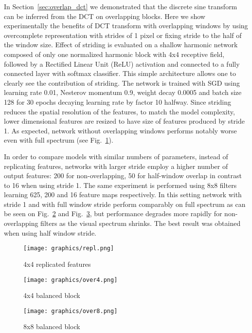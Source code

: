 \documentclass[conference]{IEEEtran}
\begin{document}
In Section~\ref{sec:overlap_dct} we  demonstrated that the discrete sine transform can be inferred from the DCT on overlapping blocks. Here we show experimentally the benefits of DCT transform with overlapping windows by using overcomplete representation with strides of 1 pixel or fixing stride to the half of the window size.
Effect of striding is evaluated on a shallow harmonic network composed of only one normalized harmonic block with 4x4 receptive field, followed by a Rectified Linear Unit (ReLU) activation and connected to a fully connected layer with softmax classifier. This simple architecture allows one to clearly see the contribution of striding. The network is trained with SGD using learning rate 0.01, Nesterov momentum 0.9, weight decay 0.0005 and batch size 128 for 30 epochs decaying learning rate by factor 10 halfway.
Since striding reduces the spatial resolution of the features, to match the model complexity, lower dimensional features are resized to have size of features produced by stride 1. As expected, network without overlapping windows performs notably worse even with full spectrum (see Fig.~\ref{fig:stride_repl}). 

In order to compare models with similar numbers of parameters, instead of replicating features, networks with larger stride employ a higher number of output features: 200 for non-overlapping, 50 for half-window overlap in contrast to 16 when using stride 1. The same experiment is performed using 8x8 filters learning 625, 200 and 16 feature maps respectively. In this setting network with stride 1 and with full window stride perform comparably on full spectrum as can be seen on Fig.~\ref{fig:stride_bal4} and Fig.~\ref{fig:stride_bal8}, but performance degrades more rapidly for non-overlapping filters as the visual spectrum shrinks. The best result was obtained when using half window stride.

\begin{figure*}
 \centering
 \begin{subfigure}[b]{0.323\linewidth}
  \texttt{[image: graphics/repl.png]}
  \caption{4x4 replicated features} \label{fig:stride_repl}
 \end{subfigure}
 \begin{subfigure}[b]{0.323\linewidth}
  \texttt{[image: graphics/over4.png]}
  \caption{4x4 balanced block} \label{fig:stride_bal4}
 \end{subfigure}
  \begin{subfigure}[b]{0.323\linewidth}
  \texttt{[image: graphics/over8.png]}
  \caption{8x8 balanced block} \label{fig:stride_bal8}
 \end{subfigure}
   \caption{Accuracy degradation of models with different strides when truncating number of DCT coefficients. Stride 1 (green), half window stride (blue) and full window stride (red) are compared. Reported values are averaged over 5 runs.} \label{fig:stride}
\end{figure*}
\end{document}
